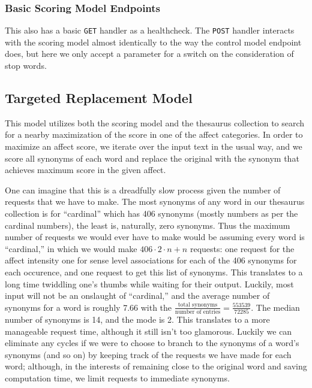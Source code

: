 \documentclass[11pt, twoside, reqno]{book}
\begin{document}
\subsubsection{\textbf{Basic Scoring Model Endpoints}}

This also has a basic \texttt{GET} handler as a healthcheck. The \texttt{POST} handler interacts with the scoring model almost identically to the way the control model endpoint does, but here we only accept a parameter for a switch on the consideration of stop words.

\subsection{Targeted Replacement Model}

This model utilizes both the scoring model and the thesaurus collection to search for a nearby maximization of the score in one of the affect categories. In order to maximize an affect score, we iterate over the input text in the usual way, and we score all synonyms of each word and replace the original with the synonym that achieves maximum score in the given affect.

One can imagine that this is a dreadfully slow process given the number of requests that we have to make. The most synonyms of any word in our thesaurus collection is for ``cardinal'' which has 406 synonyms (mostly numbers as per the cardinal numbers), the least is, naturally, zero synonyms. Thus the maximum number of requests we would ever have to make would be assuming every word is ``cardinal,'' in which we would make $406 \cdot 2 \cdot n + n$ requests: one request for the affect intensity one for sense level associations for each of the 406 synonyms for each occurence, and one request to get this list of synonyms. This translates to a long time twiddling one's thumbs while waiting for their output. Luckily, most input will not be an onslaught of ``cardinal,'' and the average number of synonyms for a word is roughly 7.66 with the $\frac{\text{total synonyms}}{\text{number of entries}} = \frac{553539}{72285}$. The median number of synonyms is 14, and the mode is 2. This translates to a more manageable request time, although it still isn't too glamorous. Luckily we can eliminate any cycles if we were to choose to branch to the synonyms of a word's synonyms (and so on) by keeping track of the requests we have made for each word; although, in the interests of remaining close to the original word and saving computation time, we limit requests to immediate synonyms.
\end{document}
